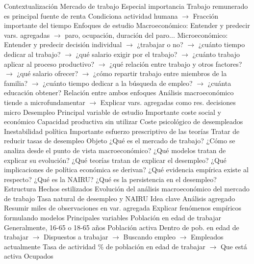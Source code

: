 \documentclass{nuevotema}
\begin{document}
\begin{esquemal}
	\1[] 
		\2 Contextualización
			\3 Mercado de trabajo
				\4 Especial importancia
				\4[] Trabajo remunerado es principal fuente de renta
				\4[] Condiciona actividad humana
				\4[] $\to$ Fracción importante del tiempo
			\3 Enfoques de estudio
				\4 Macroeconómico:
				\4[] Entender y predecir vars. agregadas
				\4[] $\to$ paro, ocupación, duración del paro...
				\4 Microeconómico:
				\4[] Entender y predecir decisión individual
				\4[] $\to$ ¿trabajar o no?
				\4[] $\to$ ¿cuánto tiempo dedicar al trabajo?
				\4[] $\to$ ¿qué salario exigir por el trabajo?
				\4[] $\to$ ¿cuánto trabajo aplicar al proceso productivo?
				\4[] $\to$ ¿qué relación entre trabajo y otros factores?
				\4[] $\to$ ¿qué salario ofrecer?
				\4[] $\to$ ¿cómo repartir trabajo entre miembros de la familia?
				\4[] $\to$ ¿cuánto tiempo dedicar a la búsqueda de empleo?
				\4[] $\to$ ¿cuánta educación obtener?
				\4 Relación entre ambos enfoques
				\4[] Análisis macroeconómico tiende a microfundamentar
				\4[] $\to$ Explicar vars. agregadas como res. decisiones micro
			\3 Desempleo
				\4 Principal variable de estudio
				\4 Importante coste social y económico
				\4[] Capacidad productiva sin utilizar
				\4[] Coste psicológico de desempleados
				\4[] Inestabilidad política
				\4 Importante esfuerzo prescriptivo de las teorías
				\4[] Tratar de reducir tasas de desempleo
		\2 Objeto
			\3 ¿Qué es el mercado de trabajo?
			\3 ¿Cómo se analiza desde el punto de vista macroeconómico?
			\3 ¿Qué modelos tratan de explicar su evolución?
			\3 ¿Qué teorías tratan de explicar el desempleo?
			\3 ¿Qué implicaciones de política económica se derivan?
			\3 ¿Qué evidencia empírica existe al respecto?
			\3 ¿Qué es la NAIRU?
			\3 ¿Qué es la persistencia en el desempleo?
		\2 Estructura
			\3 Hechos estilizados
			\3 Evolución del análisis macroeconómico del mercado de trabajo
			\3 Tasa natural de desempleo y NAIRU
	\1 
		\2 Idea clave
			\3 Análisis agregado
				\4 Resumir miles de observaciones en var. agregada
				\4 Explicar fenómenos empíricos formulando modelos
			\3 Principales variables
				\4 Población en edad de trabajar
				\4[] Generalmente, 16-65 o 18-65 años
				\4 Población activa
				\4[] Dentro de pob. en edad de trabajar
				\4[] $\to$ Dispuestos a trabajar
				\4[] $\to$ Buscando empleo
				\4[] $\to$ Empleados actualmente
				\4 Tasa de actividad
				\4[] \% de población en edad de trabajar
				\4[] $\to$ Que está activa
				\4 Ocupados

\end{esquemal}
\end{document}
